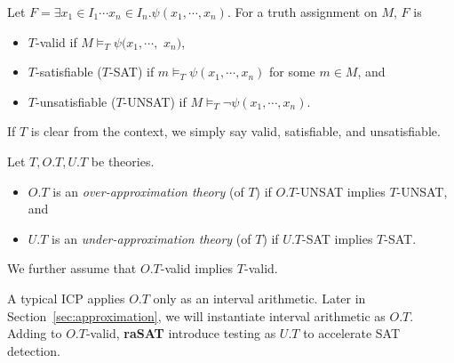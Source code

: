 \documentclass[runningheads,a4paper,oribibl]{llncs}
\newcommand{\suppress}[1]{} %
\begin{document}
\begin{definition} \label{def:app}
Let $F = \exists x_1 \in I_1 \cdots x_n \in I_n. \psi(x_1,\cdots,x_n)$. 
For a truth assignment on $M$, $F$ is 
\begin{itemize}
\item $T$-valid if $M \models_T \psi(x_1,\cdots,$ $x_n)$, 
\item $T$-satisfiable ($T$-SAT) if $m \models_T \psi(x_1,\cdots,x_n)$ 
for some $m \in M$, and 
\item $T$-unsatisfiable ($T$-UNSAT) if $M \models_T \neg \psi(x_1,\cdots,x_n)$. 
\end{itemize}
If $T$ is clear from the context, we simply say valid, satisfiable, and unsatisfiable. 
\end{definition}

\suppress{
Then, Fig. \ref{fig:T_result} illustrates Definition~\ref{def:app}. 
\begin{figure} [ht]
\centering
\begin{minipage}[b]{0.45\linewidth}
  \texttt{[image: T\_result.eps]}
\caption{Results of a target constraint $F$ in a theory $T$}
\label{fig:T_result}
\end{minipage}
\quad
\begin{minipage}[b]{0.45\linewidth}
   \texttt{[image: frame\_app.eps]}
\caption{{\bf raSAT} loop}
\label{fig:frame}
\end{minipage}
\end{figure}
}

\begin{definition} \label{def:ApproxTheory}
Let $T, O.T, U.T$ be theories. 
\begin{itemize}
\item $O.T$ is an {\em over-approximation theory} (of $T$) 
if $O.T$-UNSAT implies $T$-UNSAT, and
\item $U.T$ is an {\em under-approximation theory} (of $T$)
if $U.T$-SAT implies $T$-SAT. 
\end{itemize}
We further assume that $O.T$-valid implies $T$-valid. 
\end{definition}

A typical ICP applies $O.T$ only as an interval arithmetic. 
Later in Section~\ref{sec:approximation}, we will instantiate interval arithmetic as $O.T$. 
Adding to $O.T$-valid, {\bf raSAT} introduce testing as $U.T$ to accelerate SAT detection. 
\end{document}
